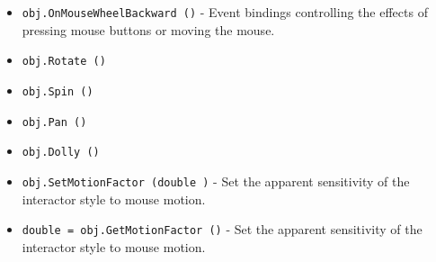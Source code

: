 \begin{itemize}
\item  \verb|obj.OnMouseWheelBackward ()| -  Event bindings controlling the effects of pressing mouse buttons
 or moving the mouse.

\item  \verb|obj.Rotate ()|

\item  \verb|obj.Spin ()|

\item  \verb|obj.Pan ()|

\item  \verb|obj.Dolly ()|

\item  \verb|obj.SetMotionFactor (double )| -  Set the apparent sensitivity of the interactor style to mouse motion.

\item  \verb|double = obj.GetMotionFactor ()| -  Set the apparent sensitivity of the interactor style to mouse motion.

\end{itemize}
